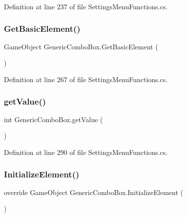 Definition at line 237 of file Settings\+Menu\+Functions.\+cs.

\mbox{\label{class_generic_combo_box_a06629d512c45d7080fef30ca4034efea}} 
\subsubsection{\texorpdfstring{Get\+Basic\+Element()}{GetBasicElement()}}
{\footnotesize\ttfamily Game\+Object Generic\+Combo\+Box.\+Get\+Basic\+Element (\begin{DoxyParamCaption}{ }\end{DoxyParamCaption})}



Definition at line 267 of file Settings\+Menu\+Functions.\+cs.

\mbox{\label{class_generic_combo_box_ae46ddf9be6f30159a56950e3f1184432}} 
\subsubsection{\texorpdfstring{get\+Value()}{getValue()}}
{\footnotesize\ttfamily int Generic\+Combo\+Box.\+get\+Value (\begin{DoxyParamCaption}{ }\end{DoxyParamCaption})}



Definition at line 290 of file Settings\+Menu\+Functions.\+cs.

\mbox{\label{class_generic_combo_box_ae1800a7c68d3af046a2b147e117437ff}} 
\subsubsection{\texorpdfstring{Initialize\+Element()}{InitializeElement()}}
{\footnotesize\ttfamily override Game\+Object Generic\+Combo\+Box.\+Initialize\+Element (\begin{DoxyParamCaption}{ }\end{DoxyParamCaption})\hspace{0.3cm}{\ttfamily [virtual]}}



